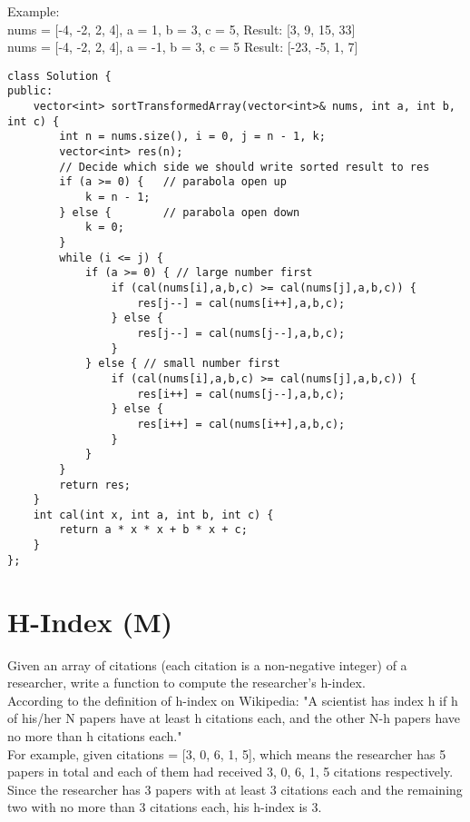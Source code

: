 Example:\\
nums = [-4, -2, 2, 4], a = 1, b = 3, c = 5,
Result: [3, 9, 15, 33]\\
nums = [-4, -2, 2, 4], a = -1, b = 3, c = 5
Result: [-23, -5, 1, 7]\\

\begin{lstlisting}
class Solution {
public:
    vector<int> sortTransformedArray(vector<int>& nums, int a, int b, int c) {
        int n = nums.size(), i = 0, j = n - 1, k;
        vector<int> res(n);
        // Decide which side we should write sorted result to res
        if (a >= 0) {   // parabola open up
            k = n - 1;
        } else {        // parabola open down
            k = 0;
        }
        while (i <= j) {
            if (a >= 0) { // large number first
                if (cal(nums[i],a,b,c) >= cal(nums[j],a,b,c)) {
                    res[j--] = cal(nums[i++],a,b,c);
                } else {
                    res[j--] = cal(nums[j--],a,b,c);
                }
            } else { // small number first
                if (cal(nums[i],a,b,c) >= cal(nums[j],a,b,c)) {
                    res[i++] = cal(nums[j--],a,b,c);
                } else {
                    res[i++] = cal(nums[i++],a,b,c);
                }
            }
        }
        return res;
    }
    int cal(int x, int a, int b, int c) {
        return a * x * x + b * x + c;
    }
};
\end{lstlisting}


\section{H-Index (M)}
Given an array of citations (each citation is a non-negative integer) of a researcher, write a function to compute the researcher's h-index.\\

According to the definition of h-index on Wikipedia: "A scientist has index h if h of his/her N papers have at least h citations each, and the other N-h papers have no more than h citations each."\\

For example, given citations = [3, 0, 6, 1, 5], which means the researcher has 5 papers in total and each of them had received 3, 0, 6, 1, 5 citations respectively. Since the researcher has 3 papers with at least 3 citations each and the remaining two with no more than 3 citations each, his h-index is 3.\\

